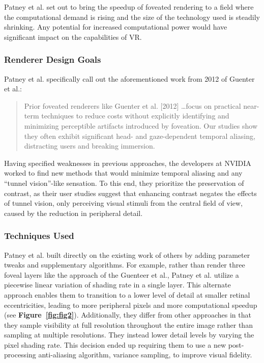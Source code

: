 \documentclass{sig-alternate}
\begin{document}
Patney et al. set out to bring the speedup of foveated rendering to a field where the computational demand is rising and the size of the technology used is steadily shrinking. Any potential for increased computational power would have significant impact on the capabilities of VR.

\subsubsection{Renderer Design Goals}
\label{nDesignGoals}

Patney et al. specifically call out the aforementioned work from 2012 of Guenter et al.:

\begin{quote}
Prior foveated renderers like Guenter et al. [2012] \ldots focus on practical near-term techniques to reduce costs without explicitly identifying and minimizing perceptible artifacts introduced by foveation. Our studies show they often exhibit significant head- and gaze-dependent temporal aliasing, distracting users and breaking immersion.~\cite{Patney:Towards}
\end{quote}

Having specified weaknesses in previous approaches, the developers at NVIDIA worked to find new methods that would minimize temporal aliasing and any ``tunnel vision''-like sensation. To this end, they prioritize the preservation of contrast, as their user studies suggest that enhancing contrast negates the effects of tunnel vision, only perceiving visual stimuli from the central field of view, caused by the reduction in peripheral detail.

\subsubsection{Techniques Used}
\label{nTechniques}

Patney et al. built directly on the existing work of others by adding parameter tweaks and supplementary algorithms. For example, rather than render three foveal layers like the approach of the Guenteer et al., Patney et al. utilize a piecewise linear variation of shading rate in a single layer. This alternate approach enables them to transition to a lower level of detail at smaller retinal eccentricities, leading to more peripheral pixels and more computational speedup (see \textbf{Figure~\ref{fig:fig2}}). Additionally, they differ from other approaches in that they sample visibility at full resolution throughout the entire image rather than sampling at multiple resolutions. They instead lower detail levels by varying the pixel shading rate. This decision ended up requiring them to use a new post-processing anti-aliasing algorithm, variance sampling, to improve visual fidelity.
\end{document}
